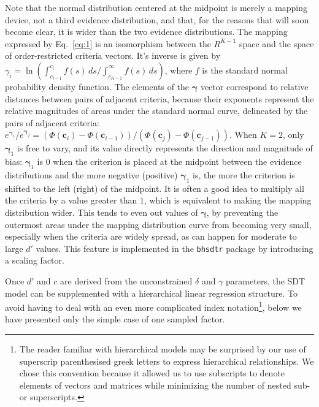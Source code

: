 \documentclass[oneside,a4paper]{article}
\begin{document}
Note that the normal distribution centered at the midpoint is merely a
mapping device, not a third evidence distribution, and that, for the
reasons that will soon become clear, it is wider than the two evidence
distributions. The mapping expressed by Eq.~\ref{eq:1} is an
isomorphism between the $R^{K-1}$ space and the space of
order-restricted criteria vectors. It's inverse is given by
$\gamma_i =\ln{(\int_{c_{i-1}}^{c_i} f(s) \,ds /
  \int_{c_{K-1}}^{\infty} f(s) \, ds)}$, where $f$ is the standard
normal probability density function. The elements of the $\bm{\gamma}$
vector correspond to relative distances between pairs of adjacent
criteria, because their exponents represent the relative
magnitudes of areas under the standard normal curve, delineated by the
pairs of adjacent criteria:
$e^{\bm{\gamma}_i} / e^{\bm{\gamma}_j} = (\Phi(\bm{c}_i) -
\Phi(\bm{c}_{i-1})) / (\Phi(\bm{c}_j) - \Phi(\bm{c}_{j-1}))$. When
$K=2$, only $\bm{\gamma}_1$ is free to vary, and its value directly
represents the direction and magnitude of bias: $\bm{\gamma}_1$ is $0$
when the criterion is placed at the midpoint between the evidence
distributions and the more negative (positive) $\bm{\gamma}_1$ is, the
more the criterion is shifted to the left (right) of the midpoint. It
is often a good idea to multiply all the criteria by a value greater
than $1$, which is equivalent to making the mapping distribution
wider. This
tends to even out values of $\bm{\gamma}$, by preventing the outermost
areas under the mapping distribution curve from becoming very small,
especially when the criteria are widely spread, as can happen for
moderate to large $d'$ values. This feature is implemented in the
\texttt{bhsdtr} package by introducing a scaling factor.

Once $d'$ and $c$ are derived from the unconstrained $\delta$ and
$\gamma$ parameters, the SDT model can be supplemented with a
hierarchical linear regression structure. To avoid having to deal with
an even more complicated index notation\footnote{The reader familiar
  with hierarchical models may be surprised by our use of superscrip
  parenthesised greek letters to express hierarchical
  relationships. We chose this convention because it allowed us to use
  subscripts to denote elements of vectors and matrices while
  minimizing the number of nested sub- or superscripts.}, below we
have presented only the simple case of one sampled factor.
\end{document}
